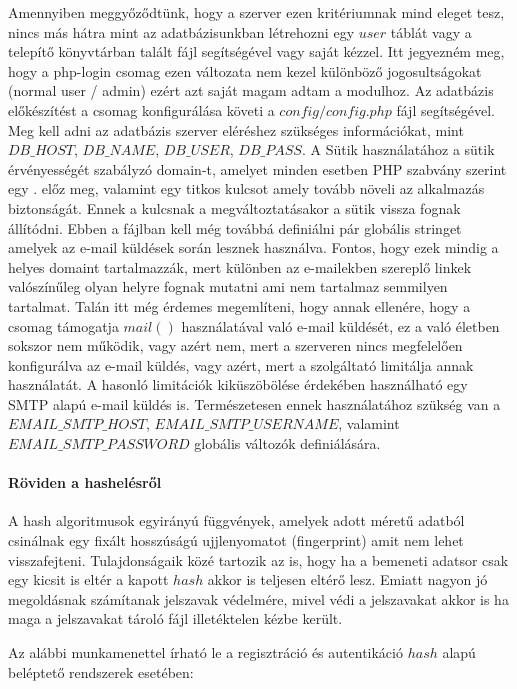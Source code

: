 \documentclass[12pt]{report}
\theoremstyle{definition}
\begin{document}
	Amennyiben meggyőződtünk, hogy a szerver ezen kritériumnak mind eleget tesz, nincs más hátra mint az adatbázisunkban létrehozni egy $user$ táblát vagy a telepítő könyvtárban talált fájl segítségével vagy saját kézzel. Itt jegyezném meg, hogy a php-login csomag ezen változata nem kezel különböző jogosultságokat (normal user / admin) ezért azt saját magam adtam a modulhoz. Az adatbázis előkészítést a csomag konfigurálása követi a $config/config.php$ fájl segítségével. Meg kell adni az adatbázis szerver eléréshez szükséges információkat, mint $DB\_HOST$, $DB\_NAME$, $DB\_USER$, $DB\_PASS$. A Sütik használatához a sütik érvényességét szabályzó domain-t, amelyet minden esetben PHP szabvány szerint egy $.$ előz meg, valamint egy titkos kulcsot amely tovább növeli az alkalmazás biztonságát. Ennek a kulcsnak a megváltoztatásakor a sütik vissza fognak állítódni. Ebben a fájlban kell még továbbá definiálni pár globális stringet amelyek az e-mail küldések során lesznek használva. Fontos, hogy ezek mindig a helyes domaint tartalmazzák, mert különben az e-mailekben szereplő linkek valószínűleg olyan helyre fognak mutatni ami nem tartalmaz semmilyen tartalmat. Talán itt még érdemes megemlíteni, hogy annak ellenére, hogy a csomag támogatja $mail\left(\right)$ használatával való e-mail küldését, ez a való életben sokszor nem működik, vagy azért nem, mert a szerveren nincs megfelelően konfigurálva az e-mail küldés, vagy azért, mert a szolgáltató limitálja annak használatát. A hasonló limitációk kiküszöbölése érdekében használható egy SMTP alapú e-mail küldés is. Természetesen ennek használatához szükség van a $EMAIL\_SMTP\_HOST$, $EMAIL\_SMTP\_USERNAME$, valamint $EMAIL\_SMTP\_PASSWORD$ globális változók definiálására.
	
	\paragraph{Röviden a hashelésről}
	A hash algoritmusok egyirányú függvények, amelyek adott méretű adatból csinálnak egy fixált hosszúságú ujjlenyomatot (fingerprint) amit nem lehet visszafejteni. Tulajdonságaik közé tartozik az is, hogy ha a bemeneti adatsor csak egy kicsit is eltér a kapott $hash$ akkor is teljesen eltérő lesz. Emiatt nagyon jó megoldásnak számítanak jelszavak védelmére, mivel védi a jelszavakat akkor is ha maga a jelszavakat tároló fájl illetéktelen kézbe került.
	
	Az alábbi munkamenettel írható le a regisztráció és autentikáció $hash$ alapú beléptető rendszerek esetében:
	
\end{document}
